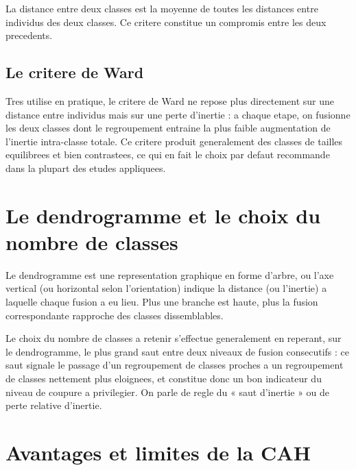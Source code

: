 \documentclass[12pt,a4paper]{book}
\begin{document}
	La distance entre deux classes est la moyenne de toutes les distances entre individus des deux classes. Ce critere constitue un compromis entre les deux precedents.
	
	\subsection{Le critere de Ward}
	
	Tres utilise en pratique, le critere de Ward ne repose plus directement sur une distance entre individus mais sur une perte d'inertie : a chaque etape, on fusionne les deux classes dont le regroupement entraine la plus faible augmentation de l'inertie intra-classe totale. Ce critere produit generalement des classes de tailles equilibrees et bien contrastees, ce qui en fait le choix par defaut recommande dans la plupart des etudes appliquees.
	
	\section{Le dendrogramme et le choix du nombre de classes}
	
	Le dendrogramme est une representation graphique en forme d'arbre, ou l'axe vertical (ou horizontal selon l'orientation) indique la distance (ou l'inertie) a laquelle chaque fusion a eu lieu. Plus une branche est haute, plus la fusion correspondante rapproche des classes dissemblables.
	
	Le choix du nombre de classes a retenir s'effectue generalement en reperant, sur le dendrogramme, le plus grand saut entre deux niveaux de fusion consecutifs : ce saut signale le passage d'un regroupement de classes proches a un regroupement de classes nettement plus eloignees, et constitue donc un bon indicateur du niveau de coupure a privilegier. On parle de regle du « saut d'inertie » ou de perte relative d'inertie.
	
	\section{Avantages et limites de la CAH}
	
\end{document}
